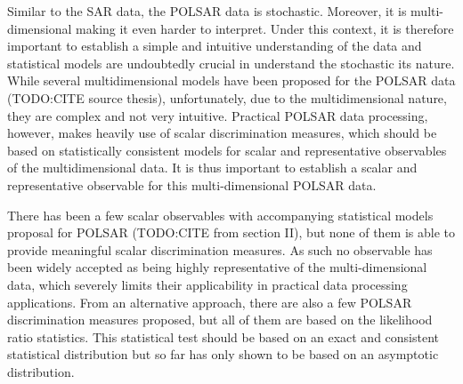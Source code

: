 \documentclass[journal]{IEEEtran}
\begin{document}
Similar to the SAR data, the POLSAR data is stochastic.
Moreover, it is multi-dimensional making it even harder to interpret.
Under this context, it is therefore important to establish a simple and intuitive understanding of the data
  and statistical models are undoubtedly crucial in understand the stochastic its nature.
While several multidimensional models have been proposed for the POLSAR data (TODO:CITE source thesis),
  unfortunately, due to the multidimensional nature, they are complex and not very intuitive.
Practical POLSAR data processing, however, makes heavily use of scalar discrimination measures,
  which should be based on statistically consistent models for scalar and representative observables of the multidimensional data.
It is thus important to establish a scalar and representative observable for this multi-dimensional POLSAR data.
  

There has been a few scalar observables with accompanying statistical models proposal for POLSAR (TODO:CITE from section II),
  but none of them is able to provide meaningful scalar discrimination measures.
As such no observable has been widely accepted as being highly representative of the multi-dimensional data,
  which severely limits their applicability in practical data processing applications.
From an alternative approach, there are also a few POLSAR discrimination measures proposed,
  but all of them are based on the likelihood ratio statistics.
This statistical test should be based on an exact and consistent statistical distribution
  but so far has only shown to be based on an asymptotic distribution.
\end{document}

